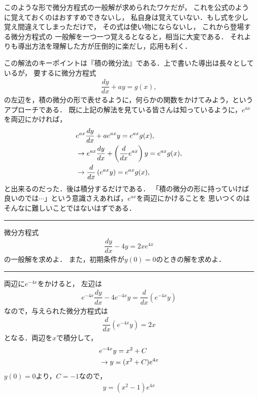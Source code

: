 このような形で微分方程式の一般解が求められたワケだが，
これを公式のように覚えておくのはおすすめできないし，
私自身は覚えていない．もし式を少し覚え間違えてしまっただけで，
その式は使い物にならないし，
これから登場する微分方程式の
一般解を一つ一つ覚えるとなると，相当に大変である．
それよりも導出方法を理解した方が圧倒的に楽だし，応用も利く．

この解法のキーポイントは『積の微分法』である．上で書いた導出は長々としているが，
要するに微分方程式
\begin{align}
 \dfrac{dy}{dx} + ay = g(x), 
\end{align}
の左辺を，積の微分の形で表せるように，何らかの関数をかけてみよう，というアプローチである．
既に上記の解法を見ている皆さんは知っているように，$e^{ax}$を両辺にかければ，
\begin{align}
 & e^{ax}\dfrac{dy}{dx} + ae^{ax}y = e^{ax}g(x), \notag \\
 & \rightarrow e^{ax}\dfrac{dy}{dx} + \left(\dfrac{d}{dx}e^{ax}\right)y = e^{ax}g(x), \notag \\
 & \rightarrow \dfrac{d}{dx}\left(e^{ax}y\right) = e^{ax}g(x), \notag
\end{align}
と出来るのだった．後は積分するだけである．
「積の微分の形に持っていけば良いのでは$\cdots$」という意識さえあれば，$e^{ax}$を両辺にかけることを
思いつくのはそんなに難しいことではないはずである．
%
\newpage
%
\hrule
\reidai
微分方程式
\begin{align}
  \dfrac{dy}{dx} - 4y = 2xe^{4x} 
\end{align}
の一般解を求めよ．
また，初期条件が$y(0)=0$のときの解を求めよ．
\vspace*{.2cm}
\hrule
\vspace*{.2cm}

両辺に$e^{-4x}$をかけると，
左辺は
\begin{align}
 e^{-4x}\dfrac{dy}{dx} - 4e^{-4x}y = \dfrac{d}{dx}\left(e^{-4x}y\right) 
\end{align}
なので，与えられた微分方程式は
\begin{align}
 \dfrac{d}{dx}\left(e^{-4x}y\right) = 2x 
\end{align}
となる．両辺を$x$で積分して，
\begin{align}
  &e^{-4x}y = x^2 + C \notag \\
  &\rightarrow y = (x^2+C)e^{4x} 
\end{align}
$y(0)=0$より，$C=-1$なので，
\begin{align}
 y = (x^2 - 1)e^{4x} 
\end{align}
%
\newpage

